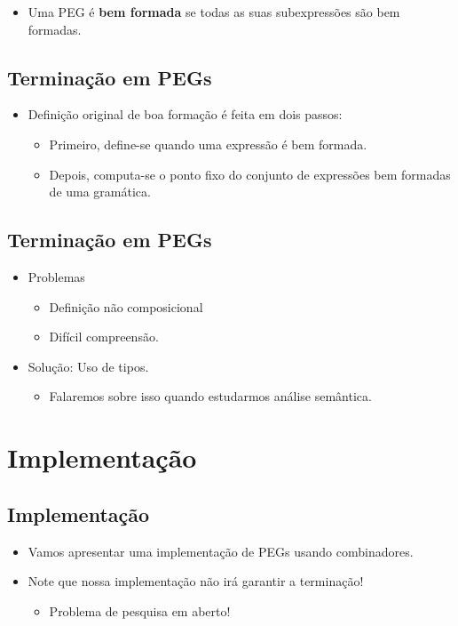 \documentclass[11pt]{article}
\begin{document}
\begin{itemize}
\item Uma PEG é \textbf{bem formada} se todas as suas subexpressões são bem formadas.
\end{itemize}
\subsection*{Terminação em PEGs}
\label{sec:orgf4b0410}

\begin{itemize}
\item Definição original de boa formação é feita em dois passos:
\begin{itemize}
\item Primeiro, define-se quando uma expressão é bem formada.
\item Depois, computa-se o ponto fixo do conjunto de expressões bem formadas de uma gramática.
\end{itemize}
\end{itemize}
\subsection*{Terminação em PEGs}
\label{sec:org0c10bdc}

\begin{itemize}
\item Problemas
\begin{itemize}
\item Definição não composicional
\item Difícil compreensão.
\end{itemize}

\item Solução: Uso de tipos.
\begin{itemize}
\item Falaremos sobre isso quando estudarmos análise semântica.
\end{itemize}
\end{itemize}
\section*{Implementação}
\label{sec:org8d69cb3}

\subsection*{Implementação}
\label{sec:org4cb1ad6}

\begin{itemize}
\item Vamos apresentar uma implementação de PEGs usando combinadores.

\item Note que nossa implementação não irá garantir a terminação!
\begin{itemize}
\item Problema de pesquisa em aberto!
\end{itemize}
\end{itemize}
\end{document}

